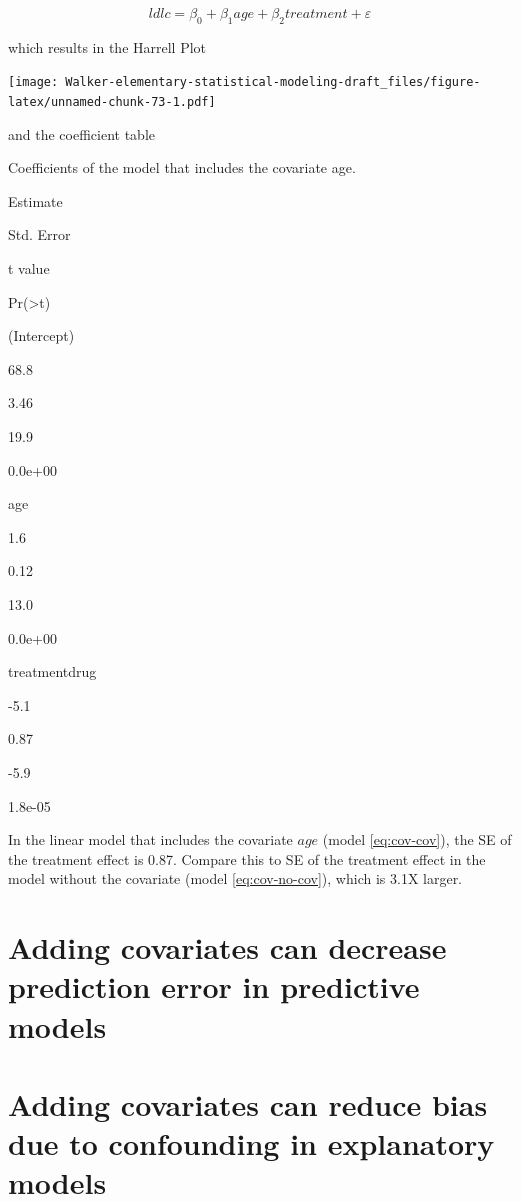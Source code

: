 \documentclass[]{book}
\begin{document}
\begin{equation}
ldlc = \beta_0 + \beta_1 age + \beta_2 treatment + \varepsilon
\label{eq:cov-cov}
\end{equation}

which results in the Harrell Plot

\texttt{[image: Walker-elementary-statistical-modeling-draft\_files/figure-latex/unnamed-chunk-73-1.pdf]}

and the coefficient table

\label{tab:unnamed-chunk-74}Coefficients of the model that includes the
covariate age.

Estimate

Std. Error

t value

Pr(\textgreater{}\textbar{}t\textbar{})

(Intercept)

68.8

3.46

19.9

0.0e+00

age

1.6

0.12

13.0

0.0e+00

treatmentdrug

-5.1

0.87

-5.9

1.8e-05

In the linear model that includes the covariate \(age\) (model
\eqref{eq:cov-cov}), the SE of the treatment effect is 0.87. Compare this
to SE of the treatment effect in the model without the covariate (model
\eqref{eq:cov-no-cov}), which is 3.1X larger.

\section{Adding covariates can decrease prediction error in predictive
models}\label{adding-covariates-can-decrease-prediction-error-in-predictive-models}

\section{Adding covariates can reduce bias due to confounding in
explanatory
models}\label{adding-covariates-can-reduce-bias-due-to-confounding-in-explanatory-models}
\end{document}
